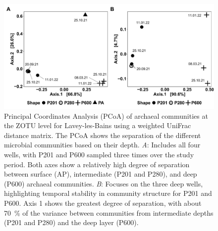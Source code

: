 \newpage
\null
\vfill
\begin{figure}[H]
\centering
\includegraphics[width=\textwidth]{chapters/06_appendix/SI_C2/PCoA_arc_wuni_all_OTUs.pdf}
\caption{Principal Coordinates Analysis (PCoA) of archaeal communities at the ZOTU level for Lavey-les-Bains using a weighted UniFrac distance matrix. The PCoA shows the separation of the different microbial communities based on their depth.
\textit{A}: Includes all four wells, with P201 and P600 sampled three times over the study period. Both axes show a relatively high degree of separation between surface (AP), intermediate (P201 and P280), and deep (P600) archaeal communities.
\textit{B}: Focuses on the three deep wells, highlighting temporal stability in community structure for P201 and P600. Axis 1 shows the greatest degree of separation, with about \SI{70}{\percent} of the variance between communities from intermediate depths (P201 and P280) and the deep layer (P600).}
\label{figSI:PCoA_arc}
\end{figure}
\vfill 

